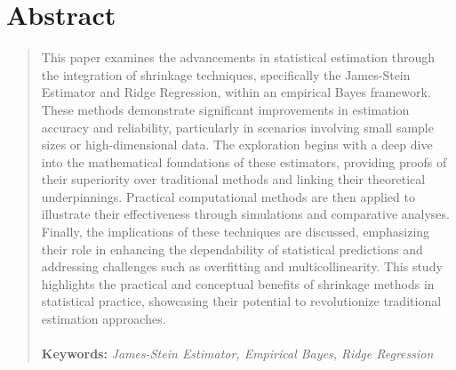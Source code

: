 

\section*{Abstract}

\begin{quote}
    This paper examines the advancements in statistical estimation through the integration of shrinkage techniques, specifically the James-Stein Estimator and Ridge Regression, within an empirical Bayes framework. These methods demonstrate significant improvements in estimation accuracy and reliability, particularly in scenarios involving small sample sizes or high-dimensional data. The exploration begins with a deep dive into the mathematical foundations of these estimators, providing proofs of their superiority over traditional methods and linking their theoretical underpinnings. Practical computational methods are then applied to illustrate their effectiveness through simulations and comparative analyses. Finally, the implications of these techniques are discussed, emphasizing their role in enhancing the dependability of statistical predictions and addressing challenges such as overfitting and multicollinearity. This study highlights the practical and conceptual benefits of shrinkage methods in statistical practice, showcasing their potential to revolutionize traditional estimation approaches.\\
    \\
    \textbf{Keywords:} \textit{James-Stein Estimator, Empirical Bayes, Ridge Regression}
\end{quote}